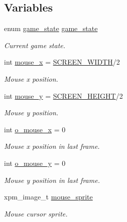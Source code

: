 \subsection*{Variables}
\begin{DoxyCompactItemize}
\item 
enum \hyperlink{group__utils_gad0ed1832dd134806ad335cdcc1a59ad2}{game\+\_\+state} \hyperlink{group__Main-Menu_ga38caf7c28534bcd60ff95faf7fcae2d7}{game\+\_\+state}
\begin{DoxyCompactList}\small\item\em Current game state. \end{DoxyCompactList}\item 
int \hyperlink{group__Main-Menu_ga6c59af730728bf5260ef828aea2eebee}{mouse\+\_\+x} = \hyperlink{group__utils_ga2cd109632a6dcccaa80b43561b1ab700}{S\+C\+R\+E\+E\+N\+\_\+\+W\+I\+D\+TH}/2
\begin{DoxyCompactList}\small\item\em Mouse x position. \end{DoxyCompactList}\item 
int \hyperlink{group__Main-Menu_gab21653e455bbca86826aa5f628a5fdb2}{mouse\+\_\+y} = \hyperlink{group__utils_ga6974d08a74da681b3957b2fead2608b8}{S\+C\+R\+E\+E\+N\+\_\+\+H\+E\+I\+G\+HT}/2
\begin{DoxyCompactList}\small\item\em Mouse y position. \end{DoxyCompactList}\item 
int \hyperlink{group__Main-Menu_gad7f272c01893c7161961744eb23516d0}{o\+\_\+mouse\+\_\+x} = 0
\begin{DoxyCompactList}\small\item\em Mouse x position in last frame. \end{DoxyCompactList}\item 
int \hyperlink{group__Main-Menu_ga7c7344b212ca479c18185090a37e0d29}{o\+\_\+mouse\+\_\+y} = 0
\begin{DoxyCompactList}\small\item\em Mouse y position in last frame. \end{DoxyCompactList}\item 
xpm\+\_\+image\+\_\+t \hyperlink{group__Main-Menu_ga1713b7f6ecba05ea9e8281f216eb8818}{mouse\+\_\+sprite}
\begin{DoxyCompactList}\small\item\em Mouse cursor sprite. \end{DoxyCompactList}\item 

\end{DoxyCompactItemize}

